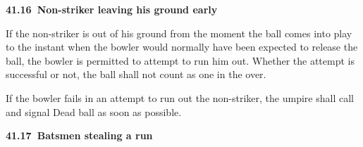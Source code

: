 \documentclass[12pt]{article}
\begin{document}
\vspace{\baselineskip}

\vspace{\baselineskip}

\vspace{\baselineskip}

\vspace{\baselineskip}

\vspace{\baselineskip}

\vspace{\baselineskip}
\begin{Center}
{\fontsize{8pt}{9.6pt}\par}
\end{Center}\par


\vspace{\baselineskip}
{\fontsize{11pt}{13.2pt}\selectfont \textbf{41.16\  Non-striker leaving his ground early}\par}\par


\vspace{\baselineskip}
\begin{adjustwidth}{0.0in}{0.12in}
{\fontsize{9pt}{10.8pt}\selectfont If the non-striker is out of his ground from the moment the ball comes into play to the instant when the bowler would normally have been expected to release the ball, the bowler is permitted to attempt to run him out. Whether the attempt is successful or not, the ball shall not count as one in the over.\par}\par

\end{adjustwidth}


\vspace{\baselineskip}
\begin{adjustwidth}{0.0in}{0.43in}
{\fontsize{9pt}{10.8pt}\selectfont If the bowler fails in an attempt to run out the non-striker, the umpire shall call and signal Dead ball as soon as possible.\par}\par

\end{adjustwidth}


\vspace{\baselineskip}
{\fontsize{11pt}{13.2pt}\selectfont \textbf{41.17\  Batsmen stealing a run}\par}\par
\end{document}
